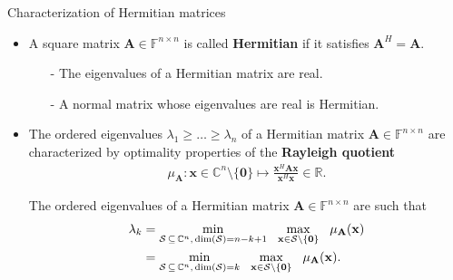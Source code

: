 \documentclass[t,usepdftitle=false]{beamer}
\begin{document}
\begin{frame}{Characterization of Hermitian matrices}
\begin{itemize}
\item A square matrix $\mathbf{A}\in\mathbb{F}^{n \times n}$ is called \textbf{Hermitian} if it satisfies $\mathbf{A}^H=\mathbf{A}$.
\begin{theorem}
\begin{itemize}
\item[-] The eigenvalues of a Hermitian matrix are real.\vspace{-.1cm}
\item[-] A normal matrix whose eigenvalues are real is Hermitian.
\end{itemize}
\end{theorem}
\item The ordered eigenvalues $\lambda_1\geq\dots\geq\lambda_n$ of a Hermitian matrix $\mathbf{A}\in\mathbb{F}^{n \times n}$ are characterized by optimality properties of the \textbf{Rayleigh quotient}\vspace{-.02cm}
\begin{align*}
\mu_{\mathbf{A}}:\mathbf{x}\in\mathbb{C}^{n}\!\setminus\!\{\mathbf{0}\}\mapsto\frac{\mathbf{x}^H\mathbf{A}\mathbf{x}}{\mathbf{x}^H\mathbf{x}}\in\mathbb{R}.
\end{align*}
\vspace{-.35cm}
\begin{theorem}
The ordered eigenvalues of a Hermitian matrix $\mathbf{A}\in\mathbb{F}^{n \times n}$ are such that\vspace{-.35cm}
\begin{align*}
\lambda_k
=&\;
\underset{\mathcal{S}\,\subseteq\,\mathbb{C}^n,\,\dim(\mathcal{S})=n-k+1}{\min}
\hspace{.3cm}
\underset{\mathbf{x}\in\mathcal{S}\setminus\{\mathbf{0}\}}{\max}
\hspace{.3cm}
\mu_{\mathbf{A}}(\mathbf{x})\\
=&\;
\underset{\mathcal{S}\,\subseteq\,\mathbb{C}^n,\,\dim(\mathcal{S})=k}{\min}
\hspace{.3cm}
\underset{\mathbf{x}\in\mathcal{S}\setminus\{\mathbf{0}\}}{\max}
\hspace{.3cm}
\mu_{\mathbf{A}}(\mathbf{x}).
\end{align*}
\end{theorem}
\end{itemize}
\end{frame}
\end{document}
